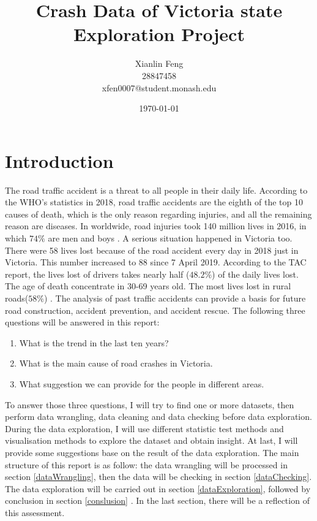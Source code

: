 \documentclass[10pt]{article}
\title{Crash Data of Victoria state Exploration Project}
\author{Xianlin Feng \\  28847458 \\ xfen0007@student.monash.edu}
\date{\today}
\theoremstyle{definition}
\begin{document}
\maketitle

\section{Introduction}
\label{Introduction}
The road traffic accident is a threat to all people in their daily life. According to the WHO's statistics in 2018, road traffic accidents are the eighth of the top 10 causes of death, which is the only reason regarding injuries, and all the remaining reason are diseases. In worldwide, road injuries took 140 million lives in 2016, in which $74\%$ are men and boys \cite{WHO2016}. A serious situation happened in Victoria too. There were 58 lives lost because of the road accident every day in 2018 just in Victoria. This number increased to 88 since 7 April 2019. According to the TAC report, the lives lost of drivers takes nearly half ($48.2\%$) of the daily lives lost. The age of death concentrate in 30-69 years old. The most lives lost in rural roads($58\%$) \cite{TAC2019}. The analysis of past traffic accidents can provide a basis for future road construction, accident prevention, and accident rescue. The following three questions will be answered in this report:
\begin{enumerate}
	\item What is the trend in the last ten years?
	\item What is the main cause of road crashes in Victoria.
	\item What suggestion we can provide for the people in different areas.
\end{enumerate}
To answer those three questions, I will try to find one or more datasets, then perform data wrangling, data cleaning and data checking before data exploration. During the data exploration, I will use different statistic test methods and visualisation methods to explore the dataset and obtain insight. At last, I will provide some suggestions base on the result of the data exploration. The main structure of this report is as follow: the data wrangling will be processed in section \ref{dataWrangling}, then the data will be checking in section \ref{dataChecking}. The data exploration will be carried out in section \ref{dataExploration}, followed by conclusion in section \ref{conslusion} . In the last section, there will be a reflection of this assessment.\par
\end{document}
